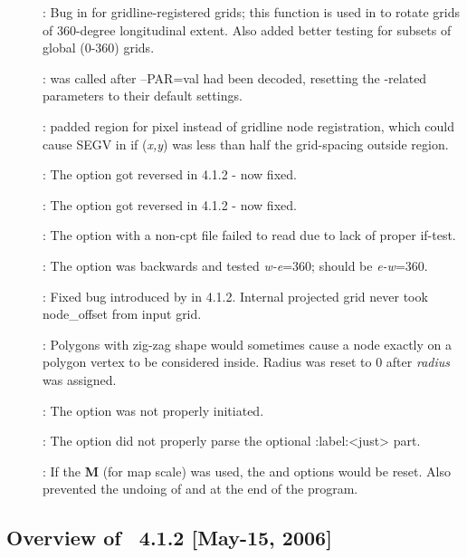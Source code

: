 \begin{description}
\item []: Bug in  for gridline-registered grids; this function is used in
 to rotate grids of 360-degree longitudinal extent. Also added better testing for subsets of global (0-360) grids.
\item []:  was called after --PAR=val had been decoded, resetting
the \PS-related parameters to their default settings.
\item []:  padded region for pixel instead of gridline node registration,
which could cause SEGV in  if (\emph{x,y}) was less than half the grid-spacing outside region.
\item []: The  option got reversed in 4.1.2 - now fixed.
\item []: The  option got reversed in 4.1.2 - now fixed.
\item []: The  option with a non-cpt file failed to read due to lack of proper if-test.
\item []: The  option was backwards and tested \emph{w-e}=360; should be \emph{e-w}=360.
\item []: Fixed bug introduced by  in 4.1.2. Internal projected
grid never took node\_offset from input grid.
\item []: Polygons with zig-zag shape would sometimes cause a node exactly
on a polygon vertex to be considered inside. Radius was reset to 0 after \emph{radius} was assigned.
\item []: The  option was not properly initiated.
\item []: The  option did not properly parse the optional :label:<just> part.
\item []: If the \textbf{M} (for map scale) was used, the  and  options would be reset.
Also prevented the undoing of  and  at the end of the program.
\end{description}


\subsection{Overview of \gmt\ 4.1.2 [May-15, 2006]}

